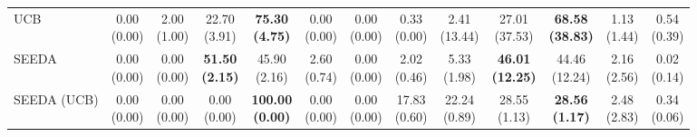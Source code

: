 \begin{table}[H]
{\begin{tabular}{l|cccccc|cccccc}
UCB & \makecell{0.00 \\ (0.00)} & \makecell{2.00 \\ (1.00)} & {\cellcolor[HTML]{C8E6C9}} \makecell{22.70 \\ (3.91)} & \bfseries \makecell{75.30 \\ (4.75)} & \makecell{0.00 \\ (0.00)} & \makecell{0.00 \\ (0.00)} & \makecell{0.33 \\ (0.00)} & \makecell{2.41 \\ (13.44)} & {\cellcolor[HTML]{C8E6C9}} \makecell{27.01 \\ (37.53)} & \bfseries \makecell{68.58 \\ (38.83)} & \makecell{1.13 \\ (1.44)} & \makecell{0.54 \\ (0.39)} \\
SEEDA & \makecell{0.00 \\ (0.00)} & \makecell{0.00 \\ (0.00)} & {\cellcolor[HTML]{C8E6C9}} \bfseries \makecell{51.50 \\ (2.15)} & \makecell{45.90 \\ (2.16)} & \makecell{2.60 \\ (0.74)} & \makecell{0.00 \\ (0.00)} & \makecell{2.02 \\ (0.46)} & \makecell{5.33 \\ (1.98)} & {\cellcolor[HTML]{C8E6C9}} \bfseries \makecell{46.01 \\ (12.25)} & \makecell{44.46 \\ (12.24)} & \makecell{2.16 \\ (2.56)} & \makecell{0.02 \\ (0.14)} \\
SEEDA (UCB) & \makecell{0.00 \\ (0.00)} & \makecell{0.00 \\ (0.00)} & {\cellcolor[HTML]{C8E6C9}} \makecell{0.00 \\ (0.00)} & \bfseries \makecell{100.00 \\ (0.00)} & \makecell{0.00 \\ (0.00)} & \makecell{0.00 \\ (0.00)} & \makecell{17.83 \\ (0.60)} & \makecell{22.24 \\ (0.89)} & {\cellcolor[HTML]{C8E6C9}} \makecell{28.55 \\ (1.13)} & \bfseries \makecell{28.56 \\ (1.17)} & \makecell{2.48 \\ (2.83)} & \makecell{0.34 \\ (0.06)} \\

\end{tabular}}
\end{table}
